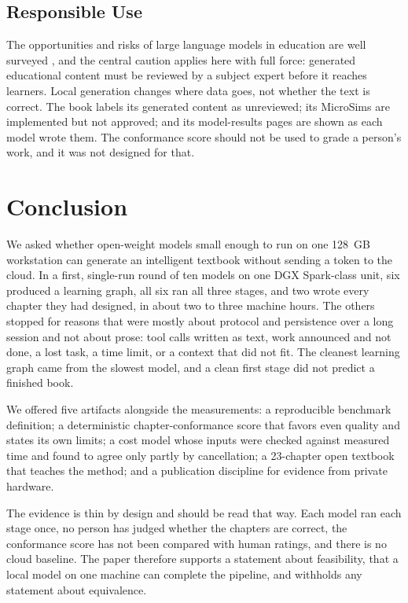 \documentclass[11pt]{article}
\begin{document}
\subsection{Responsible Use}

The opportunities and risks of large language models in education are well surveyed \cite{kasneci2023chatgpt}, and the central caution applies here with full force: generated educational content must be reviewed by a subject expert before it reaches learners. Local generation changes where data goes, not whether the text is correct. The book labels its generated content as unreviewed; its MicroSims are implemented but not approved; and its model-results pages are shown as each model wrote them. The conformance score should not be used to grade a person's work, and it was not designed for that.

\section{Conclusion}
\label{sec:conclusion}

We asked whether open-weight models small enough to run on one 128~GB workstation can generate an intelligent textbook without sending a token to the cloud. In a first, single-run round of ten models on one DGX Spark-class unit, six produced a learning graph, all six ran all three stages, and two wrote every chapter they had designed, in about two to three machine hours. The others stopped for reasons that were mostly about protocol and persistence over a long session and not about prose: tool calls written as text, work announced and not done, a lost task, a time limit, or a context that did not fit. The cleanest learning graph came from the slowest model, and a clean first stage did not predict a finished book.

We offered five artifacts alongside the measurements: a reproducible benchmark definition; a deterministic chapter-conformance score that favors even quality and states its own limits; a cost model whose inputs were checked against measured time and found to agree only partly by cancellation; a 23-chapter open textbook that teaches the method; and a publication discipline for evidence from private hardware.

The evidence is thin by design and should be read that way. Each model ran each stage once, no person has judged whether the chapters are correct, the conformance score has not been compared with human ratings, and there is no cloud baseline. The paper therefore supports a statement about feasibility, that a local model on one machine can complete the pipeline, and withholds any statement about equivalence.
\end{document}
